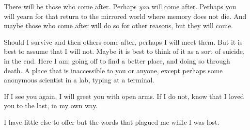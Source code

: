 There will be those who come after. Perhaps \emph{you} will come after. Perhaps you will yearn for that return to the mirrored world where memory does not die. And maybe those who come after will do so for other reasons, but they will come.

Should I survive and then others come after, perhaps I will meet them. But it is best to assume that I will not. Maybe it is best to think of it as a sort of suicide, in the end. Here I am, going off to find a better place, and doing so through death. A place that is inaccessible to you or anyone, except perhaps some anonymous scientist in a lab, typing at a terminal.

If I see you again, I will greet you with open arms. If I do not, know that I loved you to the last, in my own way.

I have little else to offer but the words that plagued me while I was lost.

